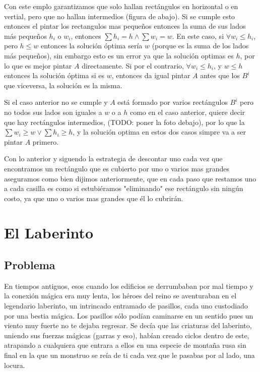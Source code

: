 \documentclass{article}
\begin{document}
    Con este emplo garantizamos que solo hallan rectángulos en horizontal o en vertial, pero que no hallan intermedios (figura de abajo). Si se cumple esto entonces el pintar los rectangulos mas pequeños entonces la suma de sus lados más pequeños $h_i$ o $w_i$, entonces $\sum{h_i} = h \land \sum{w_i} = w$. En este caso, si $\forall w_i \leq h_i$, pero $h \leq w$ entonces la solución óptima sería $w$ (porque es la suma de los lados más pequeños), sin embargo esto es un error ya que la solución optimas es $h$, por lo que es mejor pintar $A$ directamente.
    Si por el contrario, $\forall w_i \leq h_i$, y $w \leq h$ entonces la solución óptima si es $w$, entonces da igual pintar $A$ antes que los $B^{i}$ que viceversa, la solución es la misma.
  
   Si el caso anterior no se cumple y $A$ está formado por varios rectángulos $B^{i}$ pero no todos sus lados son iguales a $w$ o a $h$ como en el caso anterior, quiere decir que hay rectángulos intermedios, (TODO: poner la foto debajo), por lo que la $\sum{w_i} \geq w \lor \sum{h_i} \geq h$, y la solución optima en estos dos casos simpre va a ser pintar $A$ primero.

 Con lo anterior y siguendo la estrategia de descontar uno cada vez que encontramos un rectángulo que es cubierto por uno o varios mas grandes aseguramos como bien dijimos anteriormente, que en cada paso que restamos uno a cada casilla es como si estubiéramos "eliminando" ese rectángulo sin ningún costo, ya que uno o varios mas grandes que él lo cubrirán.
\section{El Laberinto}
	\subsection{Problema}
	En tiempos antiguos, esos cuando los edificios se derrumbaban por mal tiempo y la conexión mágica era muy lenta, los héroes del reino se aventuraban en el legendario laberinto, un intrincado entramado de pasillos, cada uno custodiado por una bestia mágica. Los pasillos sólo podían caminarse en un sentido pues un viento muy fuerte no te dejaba regresar. Se decía que las criaturas del laberinto, uniendo sus fuerzas mágicas (garras y eso), habían creado ciclos dentro de este, atrapando a cualquiera que entrara a ellos en una especie de montaña rusa sin final en la que un monstruo se reía de ti cada vez que le pasabas por al lado, una locura.
\end{document}
